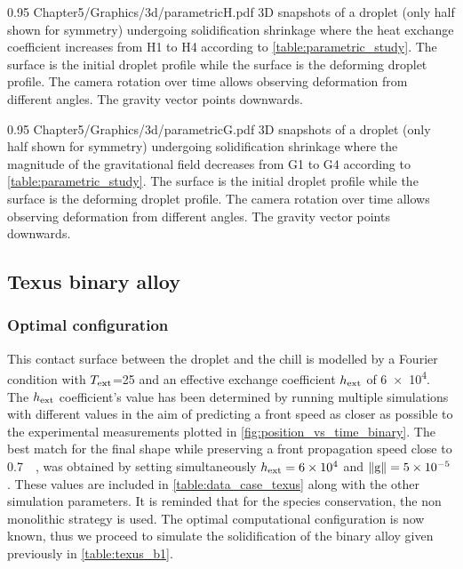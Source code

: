\begin{figureth}
{0.95}
{Chapter5/Graphics/3d/parametricH.pdf}
{3D snapshots of a droplet (only half shown for symmetry) undergoing solidification shrinkage where the heat exchange coefficient 
increases from H1 to H4 according to \cref{table:parametric_study}. The  surface is the initial droplet profile while the  surface
is the deforming droplet profile. The camera rotation over time allows observing deformation from different angles. The gravity vector points downwards.}
\label{fig:parametricH}
\end{figureth}

\begin{figureth}
{0.95}
{Chapter5/Graphics/3d/parametricG.pdf}
{3D snapshots of a droplet (only half shown for symmetry) undergoing solidification shrinkage where the magnitude of the gravitational field
decreases from G1 to G4 according to \cref{table:parametric_study}. The  surface is the initial droplet profile while the  surface
is the deforming droplet profile. The camera rotation over time allows observing deformation from different angles.
The gravity vector points downwards.}
\label{fig:parametricG}
\end{figureth}


\subsection{Texus binary alloy}

\subsubsection{Optimal configuration}

This contact surface between the droplet and the chill is modelled by a Fourier condition with $T_{\text{ext}}$=\SI{25}{\udegC} 
and an effective exchange coefficient $h_{\text{ext}}$ of \SI{6e4}{\uhconvec}.
The $h_{\text{ext}}$ coefficient's value has been determined by running multiple simulations with different values in the aim
of predicting a front speed as closer as possible to the experimental measurements plotted in \cref{fig:position_vs_time_binary}.
The best match for the final shape while preserving a front propagation
speed close to \SI{0.7}{\milli \uvelocity}, was obtained by setting simultaneously 
$h_{\text{ext}}=6 \times 10^{4}$ \si{\uhconvec} and $\lVert \boldsymbol{\text{g}} \rVert=5\times 10^{-5}$ \si{\uacceleration}.
These values are included in \cref{table:data_case_texus} along with the other simulation parameters.
It is reminded that for the species conservation, the non monolithic strategy is used.
The optimal computational configuration is now known, thus we proceed to simulate the solidification 
of the binary alloy given previously in \cref{table:texus_b1}.

